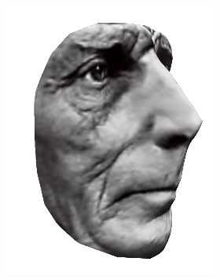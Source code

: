 \begin{figure}
    \centering
    \begin{subfigure}{0.4\textwidth}
        \centering
        \includegraphics[width=\textwidth]{statistical_normals/images/gsfs_results/celebrities/samuel_beckett_spherical_texture.png}
    \end{subfigure}
    \begin{subfigure}{0.4\textwidth}
        \centering

\end{subfigure}
\end{figure}
